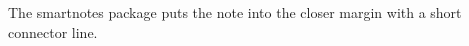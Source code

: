 \documentclass[11pt]{article}\usepackage[paperwidth=16.6cm,paperheight=7cm,left=3.6cm,right=3.6cm,top=1cm,bottom=1cm,marginparwidth=2.6cm,marginparsep=3mm]{geometry}\pagestyle{empty}
\begin{document}
The smartnotes package puts the note into the closer margin with a short connector line.
\end{document}
